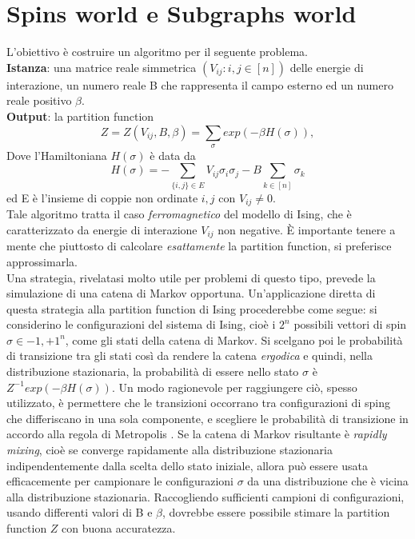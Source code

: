 \section{Spins world e Subgraphs world}\label{subgworld}
L'obiettivo è costruire un algoritmo per il seguente problema.\\
\textbf{Istanza}: una matrice reale simmetrica $(V_{ij} : i,j \in [n])$ delle energie di interazione, un numero reale B che rappresenta il campo esterno ed un numero reale positivo $\beta$.\\
\textbf{Output}: la partition function
\begin{equation}
	Z = Z(V_{ij}, B, \beta) = \sum_{\sigma}{exp(-\beta H(\sigma))},
	\label{partf}
\end{equation}
Dove l'Hamiltoniana $H(\sigma)$ è data da
\begin{equation}
	H(\sigma) = - \sum_{\{i,j\}\in E}{V_{ij}\sigma_i\sigma_j} - B\sum_{k\in [n]}{\sigma_k}
	\label{hamilt}
\end{equation}
ed E è l'insieme di coppie non ordinate ${i, j}$ con $V_{ij} \ne 0$.\\
Tale algoritmo tratta il caso \textit{ferromagnetico} del modello di Ising, che è caratterizzato da energie di interazione $V_{ij}$ non negative. È importante tenere a mente che piuttosto di calcolare \textit{esattamente} la partition function, si preferisce approssimarla.\\
Una strategia, rivelatasi molto utile per problemi di questo tipo, prevede la simulazione di una catena di Markov opportuna. Un'applicazione diretta di questa strategia alla partition function di Ising procederebbe come segue: si considerino le configurazioni del sistema di Ising, cioè i $2^n$ possibili vettori di spin $\sigma \in {-1, +1}^n$, come gli stati della catena di Markov. Si scelgano poi le probabilità di transizione tra gli stati così da rendere la catena \textit{ergodica} e quindi, nella distribuzione stazionaria, la probabilità di essere nello stato $\sigma$ è $Z^{-1}exp(-\beta H(\sigma))$. Un modo ragionevole per raggiungere ciò, spesso utilizzato, è permettere che le transizioni occorrano tra configurazioni di sping che differiscano in una sola componente, e scegliere le probabilità di transizione in accordo alla regola di Metropolis \cite{gelatt1983optimization}. Se la catena di Markov risultante è \textit{rapidly mixing}, cioè se converge rapidamente alla distribuzione stazionaria indipendentemente dalla scelta dello stato iniziale, allora può essere usata efficacemente per campionare le configurazioni $\sigma$ da una distribuzione che è vicina alla distribuzione stazionaria. Raccogliendo sufficienti campioni di configurazioni, usando differenti valori di B e $\beta$, dovrebbe essere possibile stimare la partition function $Z$ con buona accuratezza.\\

